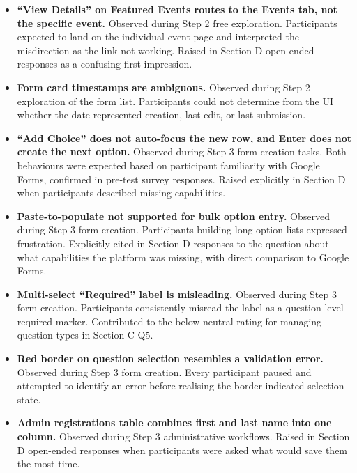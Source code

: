 \documentclass[12pt]{article}
\begin{document}
\begin{itemize}
    \item \textbf{``View Details'' on Featured Events routes to the Events tab, not the specific event.} Observed during Step 2 free exploration. Participants expected to land on the individual event page and interpreted the misdirection as the link not working. Raised in Section D open-ended responses as a confusing first impression.

    \item \textbf{Form card timestamps are ambiguous.} Observed during Step 2 exploration of the form list. Participants could not determine from the UI whether the date represented creation, last edit, or last submission.

    \item \textbf{``Add Choice'' does not auto-focus the new row, and Enter does not create the next option.} Observed during Step 3 form creation tasks. Both behaviours were expected based on participant familiarity with Google Forms, confirmed in pre-test survey responses. Raised explicitly in Section D when participants described missing capabilities.

    \item \textbf{Paste-to-populate not supported for bulk option entry.} Observed during Step 3 form creation. Participants building long option lists expressed frustration. Explicitly cited in Section D responses to the question about what capabilities the platform was missing, with direct comparison to Google Forms.

    \item \textbf{Multi-select ``Required'' label is misleading.} Observed during Step 3 form creation. Participants consistently misread the label as a question-level required marker. Contributed to the below-neutral rating for managing question types in Section C Q5.

    \item \textbf{Red border on question selection resembles a validation error.} Observed during Step 3 form creation. Every participant paused and attempted to identify an error before realising the border indicated selection state.

    \item \textbf{Admin registrations table combines first and last name into one column.} Observed during Step 3 administrative workflows. Raised in Section D open-ended responses when participants were asked what would save them the most time.


\end{itemize}
\end{document}
